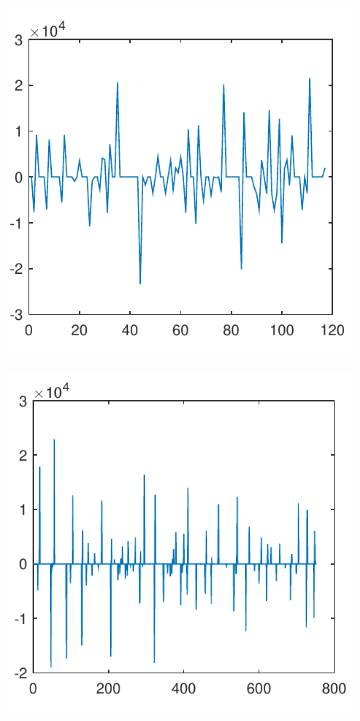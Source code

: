 \documentclass[sigconf]{acmart}
\begin{document}
	\begin{figure}[tp]
		\centering
		\begin{subfigure}[t]{0.4\linewidth}
			\centering
			\includegraphics[width=0.95\linewidth, trim={100 100 0 0}, clip=true]{fig/total_life_8}
			\label{fig:3.1a}
		\end{subfigure}
		\begin{subfigure}[t]{0.4\linewidth}
			\centering
			\includegraphics[width=0.95\linewidth, trim={100 100 0 0}, clip]{fig/total_life_20}

\end{subfigure}
\end{figure}
\end{document}
